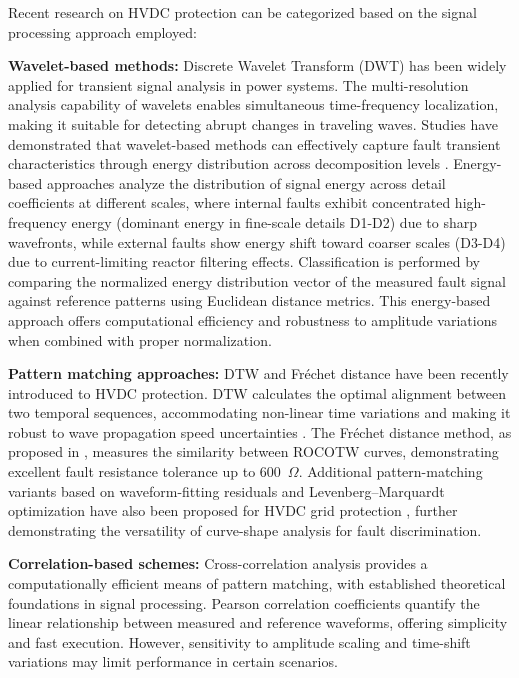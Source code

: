 \documentclass[journal]{IEEEtran}
\begin{document}
Recent research on HVDC protection can be categorized based on the signal processing approach employed:

\textbf{Wavelet-based methods:} Discrete Wavelet Transform (DWT) has been widely applied for transient signal analysis in power systems. The multi-resolution analysis capability of wavelets enables simultaneous time-frequency localization, making it suitable for detecting abrupt changes in traveling waves. Studies have demonstrated that wavelet-based methods can effectively capture fault transient characteristics through energy distribution across decomposition levels \cite{wavelet1, wavelet2, magnago1998}. Energy-based approaches analyze the distribution of signal energy across detail coefficients at different scales, where internal faults exhibit concentrated high-frequency energy (dominant energy in fine-scale details D1-D2) due to sharp wavefronts, while external faults show energy shift toward coarser scales (D3-D4) due to current-limiting reactor filtering effects. Classification is performed by comparing the normalized energy distribution vector of the measured fault signal against reference patterns using Euclidean distance metrics. This energy-based approach offers computational efficiency and robustness to amplitude variations when combined with proper normalization.

\textbf{Pattern matching approaches:} DTW and Fréchet distance have been
recently introduced to HVDC protection. DTW calculates the optimal
alignment between two temporal sequences, accommodating non-linear time
variations and making it robust to wave propagation speed uncertainties
\cite{dtw1}. The Fréchet distance method, as proposed in
\cite{reference_paper_frechet}, measures the similarity between ROCOTW
curves, demonstrating excellent fault resistance tolerance up to
600~$\Omega$. Additional pattern-matching variants based on
waveform-fitting residuals and Levenberg--Marquardt optimization have
also been proposed for HVDC grid protection \cite{pattern1, pattern2, leterme2016},
further demonstrating the versatility of curve-shape analysis for
fault discrimination.

\textbf{Correlation-based schemes:} Cross-correlation analysis provides a computationally efficient means of pattern matching, with established theoretical foundations in signal processing. Pearson correlation coefficients quantify the linear relationship between measured and reference waveforms, offering simplicity and fast execution. However, sensitivity to amplitude scaling and time-shift variations may limit performance in certain scenarios.
\end{document}
